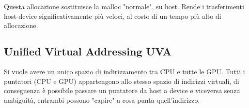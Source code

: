Questa allocazione sostituisce la malloc "normale", su host. Rende i trasferimenti host-device significativamente più veloci, al costo di un tempo più alto di allocazione.\\

\newpage

\subsection{Unified Virtual Addressing UVA}

Si vuole avere un unico spazio di indirizzamento tra CPU e tutte le GPU. Tutti i puntatori (CPU e GPU) appartengono allo stesso spazio di indirizzi virtuali, di conseguenza è possibile passare un puntatore da host a device e viceversa senza ambiguità, entrambi possono "capire" a cosa punta quell'indirizzo.\\

